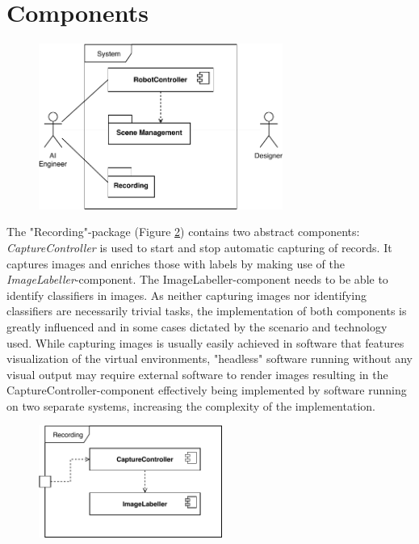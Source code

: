 \section{Components}
\begin{figure}[hb!]
    \centering
    \includegraphics[width=8cm]{img/ch04/ComponentDiagram_System.pdf}
    \label{fig:component-diagram}
\end{figure}
The "Recording"-package (Figure \ref{fig:component-diagram-recording}) contains two abstract components: \emph{CaptureController} is used to start and stop automatic capturing of records. It captures images and enriches those with labels by making use of the \emph{ImageLabeller}-component. The ImageLabeller-component needs to be able to identify classifiers in images. As neither capturing images nor identifying classifiers are necessarily trivial tasks, the implementation of both components is greatly influenced and in some cases dictated by the scenario and technology used. While capturing images is usually easily achieved in software that features visualization of the virtual environments, "headless" software running without any visual output may require external software to render images resulting in the CaptureController-component effectively being implemented by software running on two separate systems, increasing the complexity of the implementation.
\begin{figure}
    \centering
    \includegraphics[width=6cm]{img/ch04/ComponentDiagram_Recording.pdf}
    \label{fig:component-diagram-recording}
\end{figure}
